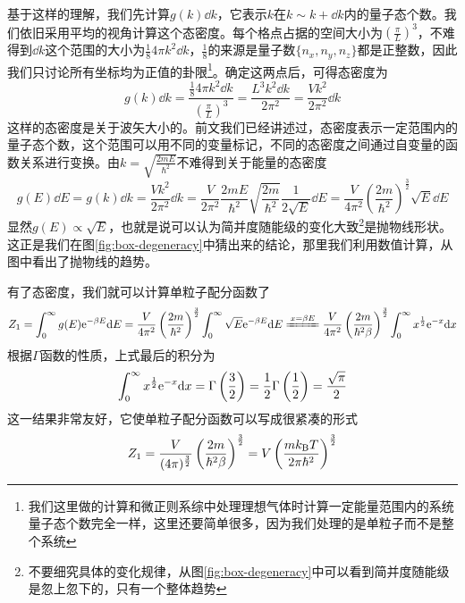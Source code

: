 \documentclass[../../main.tex]{subfiles}
\begin{document}
基于这样的理解，我们先计算\(g(k)\dd k\)，它表示\(k\)在\(k\sim k+\dd k\)内的量子态个数。我们依旧采用平均的视角计算这个态密度。每个格点占据的空间大小为\(\left(\frac{\pi}{L}\right)^3\)，不难得到\(\dd k\)这个范围的大小为\(\frac{1}{8}4\pi k^2\dd k\)，\(\frac{1}{8}\)的来源是量子数\(\{n_x,n_y,n_z\}\)都是正整数，因此我们只讨论所有坐标均为正值的卦限\footnote{我们这里做的计算和微正则系综中处理理想气体时计算一定能量范围内的系统量子态个数完全一样，这里还要简单很多，因为我们处理的是单粒子而不是整个系统}。确定这两点后，可得态密度为
\begin{equation}
    g(k)\dd k=\frac{\frac{1}{8}4\pi k^2\dd k}{\left(\frac{\pi}{L}\right)^3}=\frac{L^3k^2\dd k}{2\pi^2}=\frac{Vk^2}{2\pi^2}\dd k
\end{equation}
这样的态密度是关于波矢大小的。前文我们已经讲述过，态密度表示一定范围内的量子态个数，这个范围可以用不同的变量标记，不同的态密度之间通过自变量的函数关系进行变换。由\(k=\sqrt{\frac{2mE}{\hbar^2}}\)不难得到关于能量的态密度
\begin{equation}
    g(E)\dd E=g(k)\dd k=\frac{Vk^2}{2\pi^2}\dd k=\frac{V}{2\pi^2}\frac{2mE}{\hbar^2}\sqrt{\frac{2m}{\hbar^2}}\frac{1}{2\sqrt{E}}\dd E=\frac{V}{4\pi^2}\left(\frac{2m}{\hbar^2}\right)^{\frac{3}{2}}\sqrt{E}\dd E
\end{equation}
显然\(g(E)\propto\sqrt{E}\)，也就是说可以认为简并度随能级的变化大致\footnote{不要细究具体的变化规律，从图\ref{fig:box-degeneracy}中可以看到简并度随能级是忽上忽下的，只有一个整体趋势}是抛物线形状。这正是我们在图\ref{fig:box-degeneracy}中猜出来的结论，那里我们利用数值计算，从图中看出了抛物线的趋势。

有了态密度，我们就可以计算单粒子配分函数了
\begin{equation}
    Z_1=\int_0^{\infty}g(E)\e^{-\beta E}\dd E=\frac{V}{4\pi^2}\left(\frac{2m}{\hbar^2}\right)^{\frac{3}{2}}\int_0^{\infty}\sqrt{E}\e^{-\beta E}\dd E \xlongequal{x=\beta E}\frac{V}{4\pi^2}\left(\frac{2m}{\hbar^2\beta}\right)^{\frac{3}{2}}\int_0^{\infty}x^{\frac{1}{2}}\e^{-x}\dd x
\end{equation}
根据\(\Gamma\)函数的性质，上式最后的积分为
\begin{equation}
    \int_0^{\infty}x^{\frac{1}{2}}\mathrm{e}^{-x}\dd x=\Gamma\left(\frac{3}{2}\right)=\frac{1}{2}\Gamma\left(\frac{1}{2}\right)=\frac{\sqrt{\pi}}{2}
\end{equation}
这一结果非常友好，它使单粒子配分函数可以写成很紧凑的形式
\begin{equation}
    Z_1=\frac{V}{(4\pi)^{\frac{3}{2}}}\left(\frac{2m}{\hbar^2\beta}\right)^{\frac{3}{2}}=V\left(\frac{mk_{\mathrm{B}} T}{2\pi\hbar^2}\right)^{\frac{3}{2}}
\end{equation}
\end{document}
